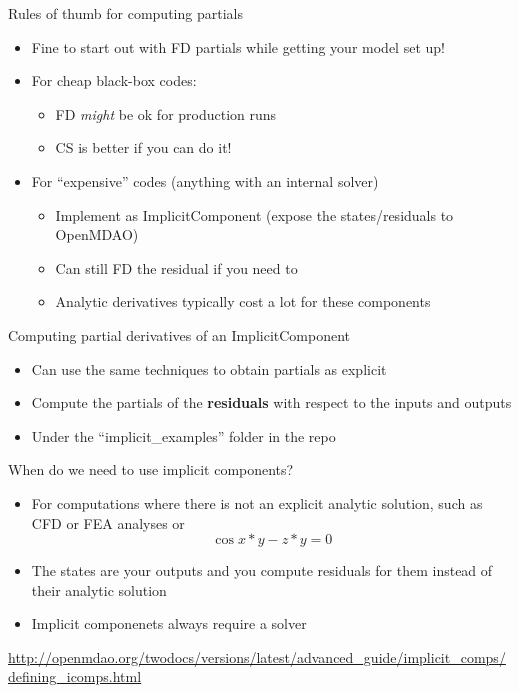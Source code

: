 \documentclass[aspectratio=169, usenames, dvipsnames, 14pt]{beamer}
\begin{document}
\begin{frame}{Rules of thumb for computing partials}

	\begin{itemize}
		\item Fine to start out with FD partials while getting your model set up!
		\item For cheap black-box codes:
		\begin{itemize}
			\item FD \textit{might} be ok for production runs
			\item CS is better if you can do it!
		\end{itemize}
		\item For ``expensive'' codes (anything with an internal solver)
		\begin{itemize}
			\item Implement as ImplicitComponent (expose the states/residuals to OpenMDAO)
			\item Can still FD the residual if you need to
			\item Analytic derivatives typically cost a lot for these components
		\end{itemize}
	\end{itemize}
	
\end{frame}      

\begingroup
{}
\begin{frame}{Computing partial derivatives of an ImplicitComponent}    
	
	\begin{itemize}
		\item Can use the same techniques to obtain partials as explicit
		\item Compute the partials of the \textbf{residuals} with respect to the inputs and outputs
		\item Under the ``implicit\_examples'' folder in the repo
	\end{itemize}

\end{frame}
\endgroup    

\begin{frame}{When do we need to use implicit components?}   

	\begin{itemize}
		\item For computations where there is not an explicit analytic solution, such as CFD or FEA analyses or $$ \cos{x*y} - z*y = 0 $$
		\item The states are your outputs and you compute residuals for them instead of their analytic solution
		\item Implicit componenets always require a solver
	\end{itemize}
	\url{http://openmdao.org/twodocs/versions/latest/advanced_guide/implicit_comps/defining_icomps.html}
	
\end{frame}  
\end{document}
